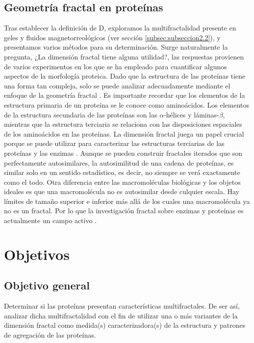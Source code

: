 \documentclass[11pt]{article}
\begin{document}
   
\subsection{Geometr\'{i}a fractal en prote\'{i}nas}
\label{subsec:subseccion2.6}


Tras establecer la definición de D, exploramos la multifractalidad presente en geles y fluidos magnetorreológicos (ver sección \ref{subsec:subseccion2.2}), y presentamos varios métodos para su determinación. Surge naturalmente la pregunta, ¿La dimensi\'{o}n fractal tiene alguna utilidad?, las respuestas provienen de varios experimentos en los que se ha empleado para cuantificar algunos aspectos de la morfolog\'{i}a proteica. Dado que la estructura de las prote\'{i}nas tiene una forma tan compleja, solo se puede analizar adecuadamente mediante el enfoque de la geometr\'{i}a fractal \cite{Mustafa1996}. 
Es importante recordar que los elementos de la estructura primaria de un prote\'{i}na se le conoce como amino\'{a}cidos. Los elementos de la estructura secundaria de las prote\'{i}nas son las $\alpha$-h\'{e}lices y l\'{a}minas-$\beta$, mientras que la estructura terciaria se relaciona con las disposiciones espaciales de los amino\'{a}cidos en las prote\'{i}nas. La dimensi\'{o}n fractal juega un papel crucial porque se puede utilizar para caracterizar las estructuras terciarias de las prote\'{i}nas y las enzimas \cite{Mustafa1996}. Aunque se pueden construir fractales iterados que son perfectamente autosimilares, la autosimilitud de una cadena de prote\'{i}nas, es similar solo en un sentido estad\'{i}stico, es decir, no siempre se ver\'{a} exactamente como el todo. Otra diferencia entre las macromol\'{e}culas biol\'{o}gicas y los objetos ideales es que una macromol\'{e}cula no es autosimilar desde culquier escala. Hay l\'{i}mites de tamaño superior e inferior m\'{a}s all\'{a} de los cuales una macromol\'{e}cula ya no es un fractal. Por lo que la investigaci\'{o}n fractal sobre enzimas y prote\'{i}nas es actualmente un campo activo \cite{Mustafa1996}. 


\clearpage


\section{Objetivos}
\subsection{Objetivo general}

Determinar si las prote\'{i}nas presentan caracter\'{i}sticas multifractales. De ser as\'{i}, analizar
dicha multifractalidad con el fin de utilizar una o m\'{a}s variantes de la
dimensi\'{o}n fractal como medida(s) caracterizadora(s)
de la estructura y patrones de agregaci\'{o}n de las prote\'{i}nas.
\end{document}
